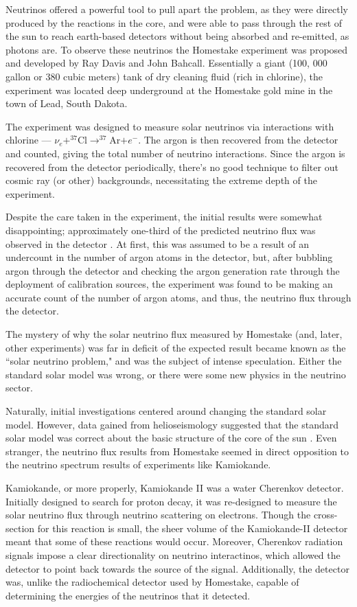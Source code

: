 Neutrinos offered a powerful tool to pull apart the problem, as they were directly produced by the reactions in the core, and were able to pass through the rest of the sun to reach earth-based detectors without being absorbed and re-emitted, as photons are. To observe these neutrinos the Homestake experiment was proposed and developed by Ray Davis and John Bahcall. Essentially a giant (100, 000 gallon or 380 cubic meters) tank of dry cleaning fluid (rich in chlorine), the experiment was located deep underground at the Homestake gold mine in the town of Lead, South Dakota. 

The experiment was designed to measure solar neutrinos via interactions with chlorine --- $\nu_e + ^{37}$Cl$ \rightarrow ^{37}$Ar$ + e^-$. The argon is then recovered from the detector and counted, giving the total number of neutrino interactions. Since the argon is recovered from the detector periodically, there's no good technique to filter out cosmic ray (or other) backgrounds, necessitating the extreme depth of the experiment. 

Despite the care taken in the experiment, the initial results were somewhat disappointing; approximately one-third of the predicted neutrino flux was observed in the detector \cite{Homestake}. At first, this was assumed to be a result of an undercount in the number of argon atoms in the detector, but, after bubbling argon through the detector and checking the argon generation rate through the deployment of calibration sources, the experiment was found to be making an accurate count of the number of argon atoms, and thus, the neutrino flux through the detector. 

The mystery of why the solar neutrino flux measured by Homestake (and, later, other experiments) was far in deficit of the expected result became known as the ``solar neutrino problem," and was the subject of intense speculation. Either the standard solar model was wrong, or there were some new physics in the neutrino sector. 

Naturally, initial investigations centered around changing the standard solar model. However, data gained from helioseismology suggested that the standard solar model was correct about the basic structure of the core of the sun \cite{Haxton}. Even stranger,  the neutrino flux results from Homestake seemed in direct opposition to the neutrino spectrum results of experiments like Kamiokande. 

Kamiokande, or more properly, Kamiokande II was a water Cherenkov detector. Initially designed to search for proton decay, it was re-designed to measure the solar neutrino flux through neutrino scattering on electrons. Though the cross-section for this reaction is small, the sheer volume of the Kamiokande-II detector meant that some of these reactions would occur. Moreover, Cherenkov radiation signals impose a clear directionality on neutrino interactinos, which allowed the detector to point back towards the source of the signal. Additionally, the detector was, unlike the radiochemical detector used by Homestake, capable of determining the energies of the neutrinos that it detected. 

